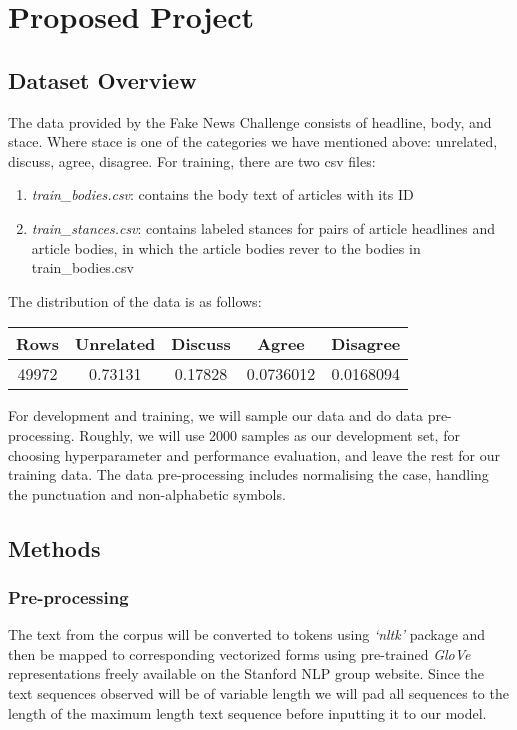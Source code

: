 \documentclass[12pt]{article}
\begin{document}
\section{Proposed Project}
\subsection{Dataset Overview}
The data provided by the Fake News Challenge consists of 
headline, body, and stace. 
Where stace is one of the categories we have mentioned above: 
unrelated, discuss, agree, disagree. 
For training, there are two csv files:
\begin{enumerate}
  \item \textit{train\_bodies.csv}: contains the body text of articles with its ID
  \item \textit{train\_stances.csv}: contains labeled stances for pairs of article 
      headlines and article bodies, in which the article bodies rever to the 
      bodies in train\_bodies.csv
\end{enumerate}
The distribution of the data is as follows:
\begin{center}
  \begin{tabular} 
    {|c|c|c|c|c|}
    \hline
    Rows & Unrelated & Discuss & Agree & Disagree \\
    \hline
    49972 & 0.73131 & 0.17828 & 0.0736012 & 0.0168094 \\
    \hline
  \end{tabular}
\end{center}

For development and training, we will sample our data and 
do data pre-processing.
Roughly, we will use 2000 samples as our development set, 
for choosing hyperparameter and performance evaluation, and leave the rest for 
our training data. 
The data pre-processing includes normalising the case, handling the punctuation
and non-alphabetic symbols.

\subsection{Methods}
\subsubsection{Pre-processing}
The text from the corpus will be converted to tokens using \textit{‘nltk’} package and 
then be mapped to corresponding vectorized forms using  pre-trained \textit{GloVe} 
representations freely available on the Stanford NLP group website. 
Since the text sequences observed will be of variable length we will pad all 
sequences to the length of the maximum length text sequence before inputting 
it to our model.
\end{document}
